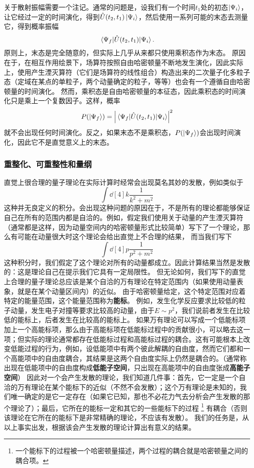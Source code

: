\documentclass[hyperref, UTF8, a4paper]{ctexart}
\begin{document}
关于散射振幅需要一个注记。通常的问题是，设我们有一个时间$t_1$处的初态$\ket{\Psi_i}$，让它经过一定的时间演化，得到$\hat{U}(t_2, t_1) \ket{\Psi_i}$，然后使用一系列可能的末态去测量它，得到概率振幅
\[
    \mel{\Psi_f}{\hat{U}(t_2, t_1)}{\Psi_i}.
\]
原则上，末态是完全随意的，但实际上几乎从来都只使用乘积态作为末态。
原因在于，在相互作用绘景下，场算符按照自由哈密顿量不断地发生演化，因此实际上，使用产生湮灭算符（它们是场算符的线性组合）构造出来的二次量子化多粒子态（定域在某点的单粒子，两个动量确定的粒子，等等）也会有一个遵循自由哈密顿量的时间演化。
然而，乘积态是自由哈密顿量的本征态，因此乘积态的时间演化只是乘上一个复数因子。这样，概率
\[
    P(\ket{\Psi_f}) = \abs{\mel{\Psi_f}{\hat{U}(t_2, t_1)}{\Psi_i} }^2
\]
就不会出现任何时间演化。反之，如果末态不是乘积态，$P(\ket{\Psi_f})$会出现时间演化，因此它不是直觉意义上的末态。


\subsubsection{重整化、可重整性和量纲}

直觉上很合理的量子理论在实际计算时经常会出现莫名其妙的发散，例如类似于
\[
    \int \dd[4]{k} \frac{1}{k^2+m^2}
\]
这种并无良定义的积分。会出现这种问题的原因在于，不是所有的理论都能够保证自己在所有的范围内都是自洽的。例如，假定我们使用关于动量的产生湮灭算符（通常都是这样，因为动量空间内的哈密顿量形式比较简单）写下了一个理论，那么有可能在动量很大时这个理论会给出直觉上不合理的结果，
而当我们写下
\[
    \int \dd[4]{p} \frac{1}{p^2+m^2}
\]
这种积分时，我们假定了这个理论对所有的动量都成立。因此计算结果当然是发散的：这是理论自己在提示我们它具有一定局限性。
但无论如何，我们写下的直觉上合理的量子理论总应该是某个自洽的万有理论在特定范围内（如果使用动量表象，就是在某个动量区间内）的近似。
由于哈密顿量给定，这个特定范围对应着特定的能量范围，这个能量范围称为\textbf{能标}。
例如，发生化学反应要求比较低的粒子动量，发生电子对撞等要求比较高的动量，由于$E \sim p^2$，我们说前者发生在比较低的能标上，后者发生在比较高的能标上。
如果万有理论可以写成一个低能标项加上一个高能标项，那么由于高能标项在低能标过程中的贡献很小，可以略去这一项；但实际的理论通常都存在低能标过程和高能标过程的耦合。这有可能根本上改变低能过程的行为，例如，设低能项中有两个彼此解耦的自由度，然而它们都和一个高能项中的自由度耦合，其结果是这两个自由度实际上仍然是耦合的。（通常称出现在低能项中的自由度构成\textbf{低能子空间}，只出现在高能项中的自由度张成\textbf{高能子空间}）
因此对一个会产生发散的理论，我们知道几件事：首先，它一定是一个自洽的万有理论在某个能标下的近似（不然不会发散）；这个万有理论是未知的，我们唯一确定的是它一定存在（如果它已知，那也不必花力气去分析会产生发散的那个理论了）；最后，它所在的能标一定和其它的一些能标下的过程%
\footnote{一个能标下的过程被一个哈密顿量描述，两个过程的耦合就是哈密顿量之间的耦合项。}%
有耦合（否则该理论在它所在的能标下是非常精确的理论，不应该有发散）。
我们的任务是，从以上事实出发，根据该会产生发散的理论计算出有意义的结果。
\end{document}
